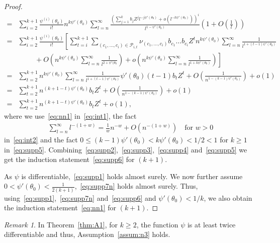 \documentclass[12pt]{amsart}
\theoremstyle{plain}
\theoremstyle{remark}
\newtheorem{remark}[theorem]{Remark}
\numberwithin{equation}{section}
\begin{document}
\begin{proof}
\begin{align}
    =& \sum_{i=2}^{k+1}\frac{\psi^{(i)}(\theta_0)}{i!}n^{k\psi'(\theta_0)}\sum_{l=n}^{\infty}\frac{\left(\sum_{j = 1}^k b_j Z^j l^{-j \psi'(\theta_0)}+ o(l^{-k\psi'(\theta_0)})\right)^i}{{l}^{1-\psi'(\theta_0)}} \left( 1+ O\left(\frac1l\right) \right) \label{eq:int1}\\
    =& \sum_{i=2}^{k+1}\frac{\psi^{(i)}(\theta_0)}{i!} \left[\sum_{t=i}^{k+1}\sum_{(c_1, \ldots, c_i) \in \mathcal{P}_{i,t}}\nu_{(c_1, \ldots, c_i)} b_{c_1}\ldots b_{c_i} Z^{t}n^{k\psi'(\theta_0)}
    \sum_{l=n}^{\infty}\frac{1}{{l}^{1 + (t-1) \psi'(\theta_0)}} %
    \right. \nonumber \\  & \hspace{1cm} + O\left( n^{k\psi'(\theta_0)} \sum_{l=n}^\infty \frac1{l^{2+\psi'(\theta_0}} \right) + \left. o\left(n^{k\psi'(\theta_0)}\sum_{l=n}^{\infty}\frac{1}{{l}^{1 + k \psi'(\theta_0)}}\right)\right] \nonumber 
    \\ =& \sum_{t=2}^{k+1}n^{k\psi'(\theta_0)} \sum_{l=n}^{\infty}\frac{1}{{l}^{1+(t-1)\psi'(\theta_0)}}%
    \psi'(\theta_0) (t-1) b_t Z^{t} + O\left(\frac{1}{n^{1-(k-1)\psi'(\theta_0)}}\right) + o\left(1\right) \nonumber \\ 
    =& \sum_{t=2}^{k+1} n^{(k+1-t)\psi'(\theta_0)}
    b_t Z^{t}
    + 
    O\left(\frac{1}{n^{1-(k-1)\psi'(\theta_0)}}\right) 
    + o\left(1\right) \label{eq:int2} \\ 
    =& \sum_{t=2}^{k+1}n^{(k+1-t)\psi'(\theta_0)}b_t Z^{t} +  o\left(1\right),  \label{eq:supp5}
\end{align}
where we use~\eqref{eq:nn1} in~\eqref{eq:int1}, the fact 
\begin{align} \label{eq:karamata error}
\sum_{l=n}^\infty l^{-(1+w)} = \frac1w n^{-w} + O\left(n^{-(1+w)}\right) \quad \text{for $w>0$}
\end{align}
in~\eqref{eq:int2} and the fact
$0\le (k-1) \psi'(\theta_0) < k \psi'(\theta_0) < 1/2 < 1$ for $k\ge 1$ in~\eqref{eq:supp5}. Combining~\eqref{eq:supp2},~\eqref{eq:supp3},~\eqref{eq:supp4} and~\eqref{eq:supp5} we get the induction statement~\eqref{eq:supp6} for $(k+1)$.

As $\psi$ is differentiable,~\eqref{eq:supp1} holds almost surely. We now further assume $0 < \psi'(\theta_0) < \frac1{2(k+1)}$,~\eqref{eq:supp7n} holds almost surely. Thus, using~\eqref{eq:supp1},~\eqref{eq:supp7n} and~\eqref{eq:supp6} and $\psi'(\theta_0) < {1}/{k}$, we also obtain the induction statement~\eqref{eq:nn1} for $(k+1)$.
\end{proof}

\begin{remark} \label{rem:2diff}
    In Theorem~\ref{thm:A1}, for $k\ge 2$, the function $\psi$ is at least twice differentiable and thus, Assumption~\ref{assum:n3} holds.
\end{remark}
\end{document}
